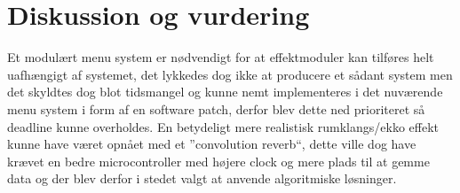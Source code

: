 \chapter{Diskussion og vurdering}\label{kap:diskussion}
\vspace*{.5cm}



Et modulært menu system er nødvendigt for at effektmoduler kan tilføres helt uafhængigt af systemet, det lykkedes dog ikke at producere et sådant system men det skyldtes dog blot tidsmangel og kunne nemt implementeres i det nuværende menu system i form af en software patch, derfor blev dette ned prioriteret så deadline kunne overholdes. 
En betydeligt mere realistisk rumklangs/ekko effekt kunne have været opnået med et ''convolution reverb``, dette ville dog have krævet en bedre microcontroller med højere clock og mere plads til at gemme data og der blev derfor i stedet valgt at anvende algoritmiske løsninger.



